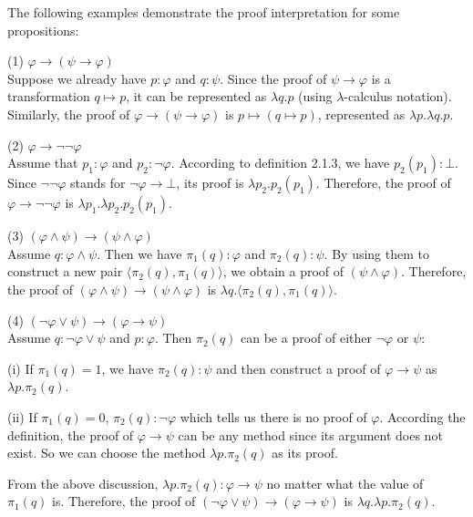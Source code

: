 The following examples demonstrate the proof interpretation for some propositions:
\begin{myitemize}
\item[(1)] $ \varphi \to ( \psi \to \varphi ) $\\
Suppose we already have $ p: \varphi $ and $ q: \psi $. Since the proof of $ \psi \to \varphi $ is a transformation $ q \mapsto p $, it can be represented as $ \lambda q . p $ (using $ \lambda $-calculus notation). Similarly, the proof of $ \varphi \to ( \psi \to \varphi ) $ is $ p \mapsto ( q \mapsto p ) $, represented as $ \lambda p . \lambda q . p $.
\item[(2)] $ \varphi \to \neg \neg \varphi $\\
Assume that $ p_1 : \varphi $ and $ p_2 : \neg \varphi $. According to definition 2.1.3, we have $ p_2 ( p_1 ) : \bot $. Since $ \neg \neg \varphi $ stands for $ \neg \varphi \to \bot $, its proof is $ \lambda p_2 . p_2 ( p_1 ) $. Therefore, the proof of $ \varphi \to \neg \neg \varphi $ is $ \lambda p_1 . \lambda p_2 . p_2 ( p_1 ) $.
\item[(3)] $ ( \varphi \land \psi ) \to ( \psi \land \varphi ) $\\
Assume $ q: \varphi \land \psi $. Then we have $ \pi _1 (q): \varphi $ and $\pi _2 (q): \psi $. By using them to construct a new pair $ \langle \pi _2 (q), \pi _1 (q) \rangle $, we obtain a proof of $( \psi \land \varphi ) $. Therefore, the proof of $ ( \varphi \land \psi ) \to ( \psi \land \varphi ) $ is $ \lambda q. \langle \pi _2 (q), \pi _1 (q) \rangle $.
\item[(4)] $ ( \neg \varphi \lor \psi ) \to ( \varphi \to \psi ) $\\
Assume $ q: \neg \varphi \lor \psi $ and $ p: \varphi $. Then $ \pi _2 (q)$ can be a proof of either $ \neg \varphi $ or $ \psi $:
  \begin{myitemize}
  \item[(i)] If $ \pi _1 (q) = 1 $, we have $ \pi _2 (q) : \psi $ and then construct a proof of $ \varphi \to \psi $ as $ \lambda p. \pi _2 (q) $.
  \item[(ii)] If $ \pi _1 (q) = 0 $, $ \pi _2 (q): \neg \varphi $ which tells us there is no proof of $ \varphi $. According the definition, the proof of $ \varphi \to \psi $ can be any method since its argument does not exist. So we can choose the method $ \lambda p. \pi _2 (q) $ as its proof.
  \end{myitemize}
From the above discussion, $ \lambda p. \pi _2 (q): \varphi \to \psi $ no matter what the value of $ \pi _1 (q) $ is. Therefore, the proof of $ ( \neg \varphi \lor \psi ) \to ( \varphi \to \psi ) $ is $ \lambda q. \lambda p. \pi _2 (q) $.
\end{myitemize}

